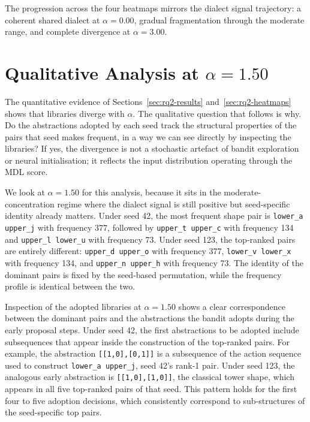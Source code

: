 The progression across the four heatmaps mirrors the dialect signal trajectory: a coherent shared dialect at $\alpha = 0.00$, gradual fragmentation through the moderate range, and complete divergence at $\alpha = 3.00$.

\section{Qualitative Analysis at $\alpha = 1.50$}
\label{sec:rq2-qualitative}

The quantitative evidence of Sections~\ref{sec:rq2-results} and~\ref{sec:rq2-heatmaps} shows that libraries diverge with $\alpha$. The qualitative question that follows is why. Do the abstractions adopted by each seed track the structural properties of the pairs that seed makes frequent, in a way we can see directly by inspecting the libraries? If yes, the divergence is not a stochastic artefact of bandit exploration or neural initialisation; it reflects the input distribution operating through the MDL score.

We look at $\alpha = 1.50$ for this analysis, because it sits in the moderate-concentration regime where the dialect signal is still positive but seed-specific identity already matters. Under seed 42, the most frequent shape pair is \texttt{lower\_a upper\_j} with frequency 377, followed by \texttt{upper\_t upper\_c} with frequency 134 and \texttt{upper\_l lower\_u} with frequency 73. Under seed 123, the top-ranked pairs are entirely different: \texttt{upper\_d upper\_o} with frequency 377, \texttt{lower\_v lower\_x} with frequency 134, and \texttt{upper\_n upper\_h} with frequency 73. The identity of the dominant pairs is fixed by the seed-based permutation, while the frequency profile is identical between the two.

Inspection of the adopted libraries at $\alpha = 1.50$ shows a clear correspondence between the dominant pairs and the abstractions the bandit adopts during the early proposal steps. Under seed 42, the first abstractions to be adopted include subsequences that appear inside the construction of the top-ranked pairs. For example, the abstraction \texttt{[[1,0],[0,1]]} is a subsequence of the action sequence used to construct \texttt{lower\_a upper\_j}, seed 42's rank-1 pair. Under seed 123, the analogous early abstraction is \texttt{[[1,0],[1,0]]}, the classical tower shape, which appears in all five top-ranked pairs of that seed. This pattern holds for the first four to five adoption decisions, which consistently correspond to sub-structures of the seed-specific top pairs.


